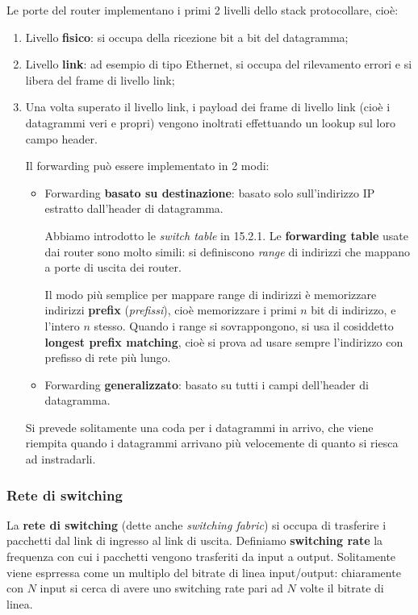 \documentclass[a4paper,11pt]{article}
\begin{document}
Le porte del router implementano i primi 2 livelli dello stack protocollare, cioè:
\begin{enumerate}
	\item Livello \textbf{fisico}: si occupa della ricezione bit a bit del datagramma;
	\item Livello \textbf{link}: ad esempio di tipo Ethernet, si occupa del rilevamento errori e si libera del frame di livello link;
	\item Una volta superato il livello link, i payload dei frame di livello link (cioè i datagrammi veri e propri) vengono inoltrati effettuando un lookup sul loro campo header. 

		Il forwarding può essere implementato in 2 modi:
		\begin{itemize}
			\item Forwarding \textbf{basato su destinazione}: basato solo sull'indirizzo IP estratto dall'header di datagramma. 

				Abbiamo introdotto le \textit{switch table} in 15.2.1.
Le \textbf{forwarding table} usate dai router sono molto simili: si definiscono \textit{range} di indirizzi che mappano a porte di uscita dei router.

Il modo più semplice per mappare range di indirizzi è memorizzare indirizzi \textbf{prefix} (\textit{prefissi}), cioè memorizzare i primi $n$ bit di indirizzo, e l'intero $n$ stesso.
Quando i range si sovrappongono, si usa il cosiddetto \textbf{longest prefix matching}, cioè si prova ad usare sempre l'indirizzo con prefisso di rete più lungo.
			\item Forwarding \textbf{generalizzato}: basato su tutti i campi dell'header di datagramma.
		\end{itemize}

		Si prevede solitamente una coda per i datagrammi in arrivo, che viene riempita quando i datagrammi arrivano più velocemente di quanto si riesca ad instradarli.
\end{enumerate}

\subsubsection{Rete di switching}
La \textbf{rete di switching} (dette anche \textit{switching fabric}) si occupa di trasferire i pacchetti dal link di ingresso al link di uscita.
Definiamo \textbf{switching rate} la frequenza con cui i pacchetti vengono trasferiti da input a output.
Solitamente viene esprressa come un multiplo del bitrate di linea input/output: chiaramente con $N$ input si cerca di avere uno switching rate pari ad $N$ volte il bitrate di linea.
\end{document}
